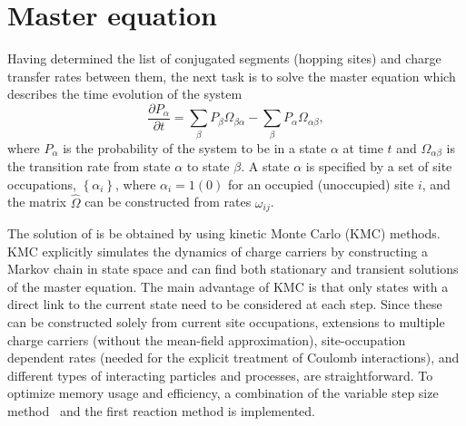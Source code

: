 \section{Master equation}
\label{sec:kmc}
Having determined the list of conjugated segments (hopping sites) and charge transfer rates between them, the next task is to solve the master equation which describes the time evolution of the system
%
\begin{equation}
\label{equ:master}
\frac{\partial P_\alpha}{\partial t} = \sum_{\beta} P_\beta \Omega_{\beta \alpha} - 
\sum_{\beta} P_\alpha \Omega_{\alpha \beta},
\end{equation}
%
where $P_\alpha$ is the probability of the system to be in a state $\alpha$ at time $t$ and $\Omega_{\alpha \beta}$ is the transition rate from state $\alpha$ to state $\beta$. A state $\alpha$ is specified by a set of site occupations, $\left\{ \alpha_i \right\}$, where $\alpha_i = 1 (0)$ for an occupied (unoccupied) site $i$, and the matrix $\hat{\Omega}$ can be constructed from rates $\omega_{ij}$.

The solution of  is be obtained by using kinetic Monte Carlo (KMC) methods. KMC explicitly simulates the dynamics of charge carriers by constructing a Markov chain in state space and can find both stationary and transient solutions of the master equation. The main advantage of KMC is that only states with a direct link to the current state need to be considered at each step. Since these can be constructed solely from current site occupations, extensions to multiple charge carriers (without the mean-field approximation), site-occupation dependent rates (needed for the explicit treatment of Coulomb interactions), and different types of interacting particles and processes, are straightforward. To optimize memory usage and efficiency, a combination of the variable step size method~\cite{bortz_new_1975} and the first reaction method is implemented.